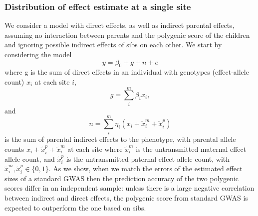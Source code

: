 \documentclass[hidelinks, 12pt]{article}
\begin{document}
\subsubsection{Distribution of effect estimate at a single site}
We consider a model with direct effects, as well as indirect parental effects, assuming no interaction between parents and the polygenic score of the children and ignoring possible indirect effects of sibs on each other.
We start by considering the model
$$y=\beta_0+g+n+e$$
where g is the sum of direct effects in an individual with genotypes (effect-allele count) $x_i$ at each site $i$,
$$g=\sum_i^m\beta_ix_i,$$ 
and 
$$n=\sum_i^m\eta_i(x_i+\tilde{x}_i^m+\tilde{x}_i^p)$$ 
is the sum of parental indirect effects to the phenotype, with parental allele counts $x_i+\tilde{x}_i^p+\tilde{x}_i^m$ at each site where $\tilde{x}_i^m$ is the untransmitted maternal effect allele count, and $\tilde{x}_i^p$ is the untransmitted paternal effect allele count, with $\tilde{x}_i^m,\tilde{x}_i^p \in \{0,1\}$.  As we show, when we match the errors of the estimated effect sizes of a standard GWAS then the prediction accuracy of the two polygenic scores differ in an independent sample: unless there is a large negative correlation between indirect and direct effects, the polygenic score from standard GWAS is expected to outperform the one based on sibs.
\end{document}
